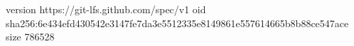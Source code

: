 version https://git-lfs.github.com/spec/v1
oid sha256:6e434efd430542e3147fe7da3e5512335e8149861e557614665b8b88ce547ace
size 786528

